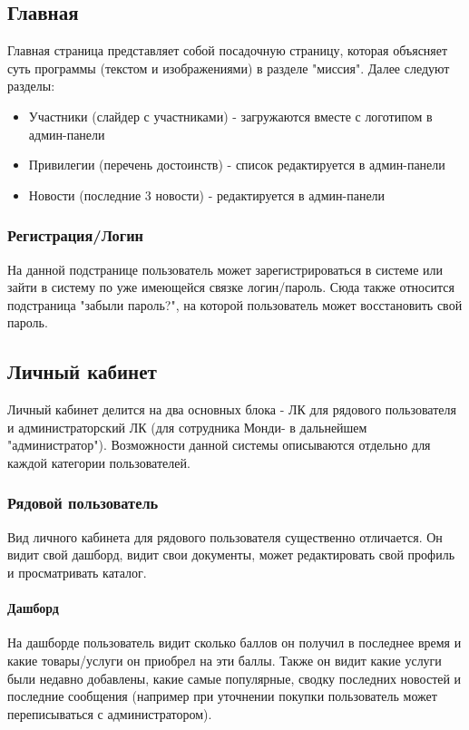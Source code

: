 \documentclass[DIV=calc, paper=a4, fontsize=11pt]{scrartcl} %
\newcommand{\clientName}{Монди}
\begin{document}
\subsection{Главная}

Главная страница представляет собой посадочную страницу, которая объясняет суть программы (текстом и изображениями) в разделе "миссия". Далее следуют разделы:

\begin{itemize}
	\item Участники (слайдер с участниками) - загружаются вместе с логотипом в админ-панели
	\item Привилегии (перечень достоинств) - список редактируется в админ-панели
	\item Новости (последние 3 новости) - редактируется в админ-панели
\end{itemize}

\subsubsection{Регистрация/Логин}
На данной подстранице пользователь может зарегистрироваться в системе или зайти в систему по уже имеющейся связке логин/пароль. Сюда также относится подстраница "забыли пароль?", на которой пользователь может восстановить свой пароль.

\subsection{Личный кабинет}

Личный кабинет делится на два основных блока - ЛК для рядового пользователя и администраторский ЛК (для сотрудника \clientName - в дальнейшем "администратор"). Возможности данной системы описываются отдельно для каждой категории пользователей.


\subsubsection{Рядовой пользователь}

Вид личного кабинета для рядового пользователя существенно отличается. Он видит свой дашборд, видит свои документы, может редактировать свой профиль и просматривать каталог.


\paragraph{Дашборд}

На дашборде пользователь видит сколько баллов он получил в последнее время и какие товары/услуги он приобрел на эти баллы. Также он видит какие услуги были недавно добавлены, какие самые популярные, сводку последних новостей и последние сообщения (например при уточнении покупки пользователь может переписываться с администратором).
\end{document}
